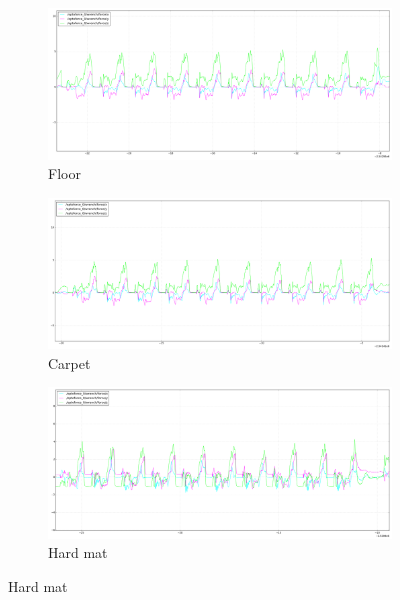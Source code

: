\documentclass[USenglish]{ifimaster}  %
\begin{document}
	\begin{figure} [h]
		\centering
		\begin{subfigure}[b]{\textwidth}
			\includegraphics[width=\textwidth,height=\textheight,keepaspectratio]{Figures/gulvgraf}
			\caption{Floor}
			\label{fig:gulvgraf} 
		\end{subfigure}
		
		\begin{subfigure}[b]{\textwidth}
			\includegraphics[width=\textwidth,height=\textheight,keepaspectratio]{Figures/teppegraf}
			\caption{Carpet}
			\label{fig:teppegraf}
		\end{subfigure}
		
		\begin{subfigure}[h]{\textwidth}
			\includegraphics[width=\textwidth,height=\textheight,keepaspectratio]{Figures/mattebgraf}
			\caption{Hard mat}
			\label{fig:mattebgraf}
		\end{subfigure}
		
	\end{figure}
\end{document}
